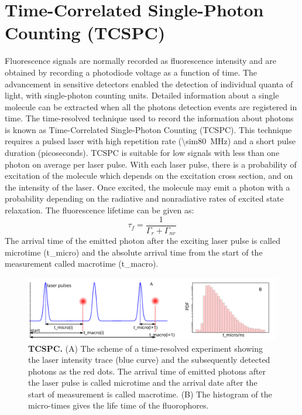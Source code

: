 \section{Time-Correlated Single-Photon Counting (TCSPC)}
Fluorescence signals are normally recorded as fluorescence intensity and are obtained by recording a photodiode voltage as a function of time.
The advancement in sensitive detectors enabled the detection of individual quanta of light, with single-photon counting units.
Detailed information about a single molecule can be extracted when all the photons detection events are registered in time.
The time-resolved technique used to record the information about photons is known as Time-Correlated Single-Photon Counting (TCSPC).\cite{oconnor2012timecorrelated,birch2002topics}
This technique requires a pulsed laser with high repetition rate (\SI{\sim80}{\MHz}) and a short pulse duration (picoseconds).
TCSPC is suitable for low signals with less than one photon on average per laser pulse.
With each laser pulse, there is a probability of excitation of the molecule which depends on the excitation cross section, and on the intensity of the laser.
Once excited, the molecule may emit a photon with a probability depending on the radiative and nonradiative rates of excited state relaxation.
The fluorescence lifetime can be given as:
\begin{equation}
	\tau_f = \frac{1}{\Gamma_{r} + \Gamma_{nr}}
\end{equation}
The arrival time of the emitted photon after the exciting laser pulse is called microtime (t\_micro) and the absolute arrival time from the start of the measurement called macrotime (t\_macro).
\begin{figure}
	\centering
	\includegraphics[width=\textwidth]{tcspc_sch}
	\caption{\textbf{TCSPC.} (A) The scheme of a time-resolved experiment showing the laser intensity trace (blue curve) and the subsequently detected photons as the red dots.
	The arrival time of emitted photons after the laser pulse is called microtime and the arrival date after the start of measurement is called macrotime.
	(B) The histogram of the micro-times gives the life time of the fluorophores.}
	\label{fig:tcspc_sch}
\end{figure}
